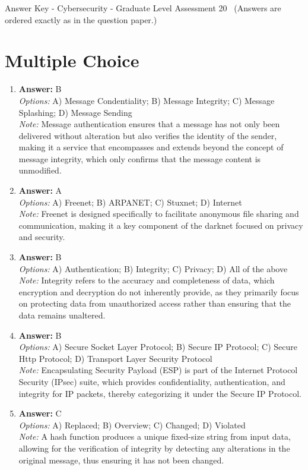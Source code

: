 \documentclass[12pt]{article}
\begin{document}
\begin{center}
Answer Key - Cybersecurity - Graduate Level Assessment 20 \
\small (Answers are ordered exactly as in the question paper.)
\end{center}

\section*{Multiple Choice}
\begin{enumerate}[label=\arabic*.]
\item \textbf{Answer:} B
\\ \textit{Options:} A) Message Condentiality; B) Message Integrity; C) Message Splashing; D) Message Sending
\\ \textit{Note:} Message authentication ensures that a message has not only been delivered without alteration but also verifies the identity of the sender, making it a service that encompasses and extends beyond the concept of message integrity, which only confirms that the message content is unmodified.
\item \textbf{Answer:} A
\\ \textit{Options:} A) Freenet; B) ARPANET; C) Stuxnet; D) Internet
\\ \textit{Note:} Freenet is designed specifically to facilitate anonymous file sharing and communication, making it a key component of the darknet focused on privacy and security.
\item \textbf{Answer:} B
\\ \textit{Options:} A) Authentication; B) Integrity; C) Privacy; D) All of the above
\\ \textit{Note:} Integrity refers to the accuracy and completeness of data, which encryption and decryption do not inherently provide, as they primarily focus on protecting data from unauthorized access rather than ensuring that the data remains unaltered.
\item \textbf{Answer:} B
\\ \textit{Options:} A) Secure Socket Layer Protocol; B) Secure IP Protocol; C) Secure Http Protocol; D) Transport Layer Security Protocol
\\ \textit{Note:} Encapsulating Security Payload (ESP) is part of the Internet Protocol Security (IPsec) suite, which provides confidentiality, authentication, and integrity for IP packets, thereby categorizing it under the Secure IP Protocol.
\item \textbf{Answer:} C
\\ \textit{Options:} A) Replaced; B) Overview; C) Changed; D) Violated
\\ \textit{Note:} A hash function produces a unique fixed-size string from input data, allowing for the verification of integrity by detecting any alterations in the original message, thus ensuring it has not been changed.
\end{enumerate}
\end{document}
